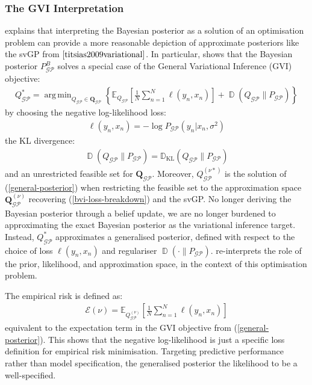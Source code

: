 \documentclass{article}
\newcommand{\KLD}{\operatorname{\mathbb{D}_{KL}}}
\newcommand{\D}{\operatorname{\mathbb{D}}}
\newcommand{\GP}{\operatorname{\mathcal{GP}}}
\DeclareMathOperator*{\argmin}{arg\,min}
\numberwithin{equation}{section}
\begin{document}
\subsubsection{The GVI Interpretation}
\cite{knoblauch2022optimization} explains that interpreting the Bayesian posterior as a solution of an optimisation problem can provide a more reasonable depiction of approximate posteriors like the svGP from $\cite{titsias2009variational}$. In particular, \cite{knoblauch2022optimization} shows that the Bayesian posterior $P_{\GP}^B$ solves a special case of the General Variational Inference (GVI) objective:
\begin{align}
Q_{\GP}^* = \argmin_{Q_{\GP} \in \boldsymbol{Q}_{\GP}} \left\{ \mathbb{E}_{Q_{\GP}}\left[\frac{1}{N}\sum_{n=1}^N \ell(y_n, x_n)\right] + \D\left(Q_{\GP}\|P_{\GP}\right)\right\}
\label{general-posterior}
\end{align}
by choosing the negative log-likelihood loss:
\begin{align}
    \ell(y_n, x_n) = -\log P_{\GP}\left(y_n \vert x_n, \sigma^2\right)
\end{align}
the KL divergence:
\begin{align}
    \D\left(Q_{\GP}\|P_{\GP}\right) = \KLD\left(Q_{\GP}\|P_{\GP}\right)
\end{align}
and an unrestricted feasible set for $\boldsymbol{Q}_{\GP}$. Moreover, $Q_{\GP}^{(\nu*)}$ is the solution of (\ref{general-posterior}) when restricting the feasible set to the approximation space $\boldsymbol{Q}_{\GP}^{(\nu)}$ recovering (\ref{bvi-loss-breakdown}) and the svGP. No longer deriving the Bayesian posterior through a belief update, we are no longer burdened to approximating the exact Bayesian posterior as the variational inference target. Instead, $Q_{\GP}^*$ approximates a generalised posterior, defined with respect to the choice of loss $\ell(y_n, x_n)$ and regulariser $\D\left(\cdot \| P_{\GP}\right)$.  \cite{knoblauch2022optimization} re-interprets the role of the prior, likelihood, and approximation space, in the context of this optimisation problem.

The empirical risk is defined as: 
\begin{align}
\mathcal{E}(\nu) = \mathbb{E}_{Q_{\GP}^{(\nu)}}\left[\frac{1}{N}\sum_{n=1}^N \ell\left(y_n, x_n\right)\right]
\label{empirical-risk}
\end{align}
equivalent to the expectation term in the GVI objective from (\ref{general-posterior}). This shows that the negative log-likelihood is just a specific loss definition for empirical risk minimisation. Targeting predictive performance rather than model specification, the generalised posterior the likelihood to be a well-specified.
\end{document}
